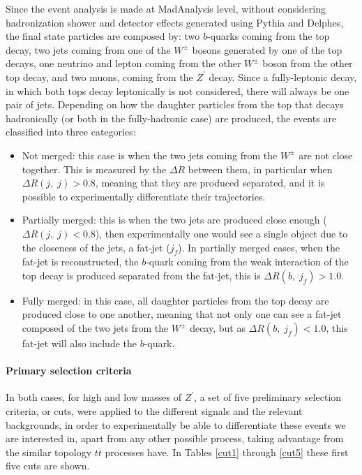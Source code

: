 Since the event analysis is made at MadAnalysis level, without considering hadronization shower and detector effects generated using Pythia and Delphes, the final state particles are composed by: two $b$-quarks coming from the top decay, two jets coming from one of the $W^{\pm}$ bosons generated by one of the top decays, one neutrino and lepton coming from the other $W^{\pm}$ boson from the other top decay, and two muons, coming from the $Z^{\prime}$ decay. Since a fully-leptonic decay, in which both tops decay leptonically is not considered, there will always be one pair of jets. Depending on how the daughter particles from the top that decays hadronically (or both in the fully-hadronic case) are produced, the events are classified into three categories:
\begin{itemize}
    \item Not merged: this case is when the two jets coming from the $W^{\pm}$ are not close together. This is measured by the $\Delta R$ between them, in particular when $\Delta R (j, \; j) > 0.8$, meaning that they are produced separated, and it is possible to experimentally differentiate their trajectories.
    \item Partially merged: this is when the two jets are produced close enough ($\Delta R (j, \; j) < 0.8$), then experimentally one would see a single object due to the closeness of the jets, a fat-jet ($j_f$). In partially merged cases, when the fat-jet is reconstructed, the $b$-quark coming from the weak interaction of the top decay is produced separated from the fat-jet, this is $\Delta R (b, \; j_f) > 1.0$.
    \item Fully merged: in this case, all daughter particles from the top decay are produced close to one another, meaning that not only one can see a fat-jet composed of the two jets from the $W^{\pm}$ decay, but as $\Delta R(b, \; j_f) < 1.0$, this fat-jet will also include the $b$-quark.
\end{itemize}

\paragraph{Primary selection criteria}\label{ssec:selectioncriteria}

In both cases, for high and low masses of $Z^{\prime}$, a set of five preliminary selection criteria, or cuts, were applied to the different signals and the relevant backgrounds, in order to experimentally be able to differentiate these events we are interested in, apart from any other possible process, taking advantage from the similar topology $t\overline t$ processes have. In Tables \ref{cut1} through \ref{cut5} these first five cuts are shown.

